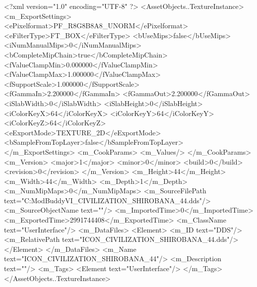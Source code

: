 <?xml version="1.0" encoding="UTF-8" ?>
<AssetObjects..TextureInstance>
	<m_ExportSettings>
		<ePixelformat>PF_R8G8B8A8_UNORM</ePixelformat>
		<eFilterType>FT_BOX</eFilterType>
		<bUseMips>false</bUseMips>
		<iNumManualMips>0</iNumManualMips>
		<bCompleteMipChain>true</bCompleteMipChain>
		<fValueClampMin>0.000000</fValueClampMin>
		<fValueClampMax>1.000000</fValueClampMax>
		<fSupportScale>1.000000</fSupportScale>
		<fGammaIn>2.200000</fGammaIn>
		<fGammaOut>2.200000</fGammaOut>
		<iSlabWidth>0</iSlabWidth>
		<iSlabHeight>0</iSlabHeight>
		<iColorKeyX>64</iColorKeyX>
		<iColorKeyY>64</iColorKeyY>
		<iColorKeyZ>64</iColorKeyZ>
		<eExportMode>TEXTURE_2D</eExportMode>
		<bSampleFromTopLayer>false</bSampleFromTopLayer>
	</m_ExportSettings>
	<m_CookParams>
		<m_Values/>
	</m_CookParams>
	<m_Version>
		<major>1</major>
		<minor>0</minor>
		<build>0</build>
		<revision>0</revision>
	</m_Version>
	<m_Height>44</m_Height>
	<m_Width>44</m_Width>
	<m_Depth>1</m_Depth>
	<m_NumMipMaps>0</m_NumMipMaps>
	<m_SourceFilePath text="C:\Users\asus\Documents\Firaxis ModBuddy\Civilization VI\temppic\ICON_CIVILIZATION_SHIROBANA_44.dds"/>
	<m_SourceObjectName text=""/>
	<m_ImportedTime>0</m_ImportedTime>
	<m_ExportedTime>2991744408</m_ExportedTime>
	<m_ClassName text="UserInterface"/>
	<m_DataFiles>
		<Element>
			<m_ID text="DDS"/>
			<m_RelativePath text="ICON_CIVILIZATION_SHIROBANA_44.dds"/>
		</Element>
	</m_DataFiles>
	<m_Name text="ICON_CIVILIZATION_SHIROBANA_44"/>
	<m_Description text=""/>
	<m_Tags>
		<Element text="UserInterface"/>
	</m_Tags>
</AssetObjects..TextureInstance>

